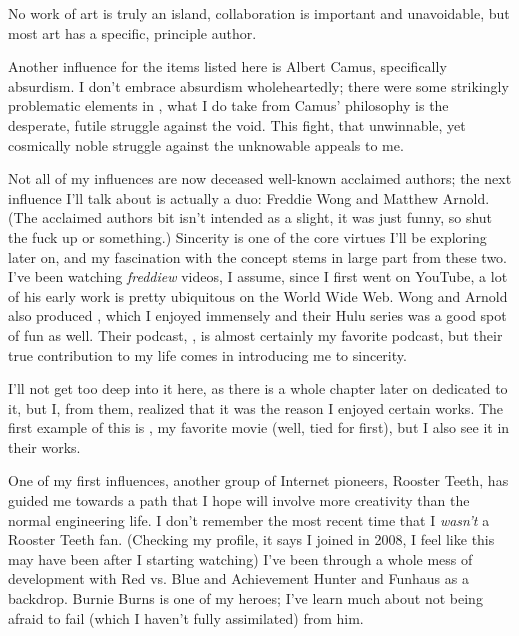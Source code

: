\documentclass[./butidigress.tex]{subfiles}
\begin{document}
No work of art is truly an island, collaboration is important and unavoidable, but most art has a specific, principle author.

Another influence for the items listed here is Albert Camus, specifically absurdism.
I don't embrace absurdism wholeheartedly; there were some strikingly problematic elements in , what I do take from Camus' philosophy is the desperate, futile struggle against the void.
This fight, that unwinnable, yet cosmically noble struggle against the unknowable appeals to me.

Not all of my influences are now deceased well-known acclaimed authors; the next influence I'll talk about is actually a duo: Freddie Wong and Matthew Arnold.
(The acclaimed authors bit isn't intended as a slight, it was just funny, so shut the fuck up or something.)
Sincerity is one of the core virtues I'll be exploring later on, and my fascination with the concept stems in large part from these two.
I've been watching \textit{freddiew} videos, I assume, since I first went on YouTube, a lot of his early work is pretty ubiquitous on the World Wide Web.
Wong and Arnold also produced , which I enjoyed immensely and their Hulu series was a good spot of fun as well.
Their podcast, , is almost certainly my favorite podcast, but their true contribution to my life comes in introducing me to sincerity.

I'll not get too deep into it here, as there is a whole chapter later on dedicated to it, but I, from them, realized that it was the reason I enjoyed certain works.
The first example of this is , my favorite movie (well, tied for first), but I also see it in their works.

One of my first influences, another group of Internet pioneers, Rooster Teeth, has guided me towards a path that I hope will involve more creativity than the normal engineering life.
I don't remember the most recent time that I \emph{wasn't} a Rooster Teeth fan.
(Checking my profile, it says I joined in 2008, I feel like this may have been after I starting watching)
I've been through a whole mess of development with Red vs. Blue and Achievement Hunter and Funhaus as a backdrop.
Burnie Burns is one of my heroes; I've learn much about not being afraid to fail (which I haven't fully assimilated) from him.
\end{document}

